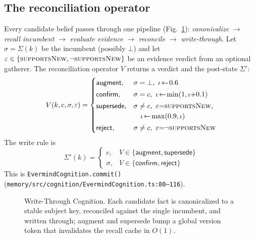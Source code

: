 \documentclass[journal,onecolumn,11pt]{IEEEtran}
\begin{document}
\subsection{The reconciliation operator}
Every candidate belief passes through one pipeline
(Fig.~\ref{fig:writethrough}): \emph{canonicalize} $\to$ \emph{recall incumbent}
$\to$ \emph{evaluate evidence} $\to$ \emph{reconcile} $\to$ \emph{write-through}.
Let $\sigma=\Sigma(k)$ be the incumbent (possibly $\bot$) and let
$\varepsilon\in\{\textsc{supportsNew},\neg\textsc{supportsNew}\}$ be an evidence
verdict from an optional gatherer. The reconciliation operator
$V$ returns a verdict and the post-state $\Sigma'$:
\begin{equation}
V(k,c,\sigma,\varepsilon)=
\begin{cases}
\textsf{augment}, & \sigma=\bot,\ \iota\!\leftarrow\!0.6\\[2pt]
\textsf{confirm}, & \sigma=c,\ \iota\!\leftarrow\!\min(1,\iota{+}0.1)\\[2pt]
\textsf{supersede}, & \sigma\neq c,\ \varepsilon{=}\textsc{supportsNew},\\
 & \quad \iota\!\leftarrow\!\max(0.9,\iota)\\[2pt]
\textsf{reject}, & \sigma\neq c,\ \varepsilon{=}\neg\textsc{supportsNew}
\end{cases}
\label{eq:verdict}
\end{equation}
The write rule is
\begin{equation}
\Sigma'(k)=
\begin{cases}
c, & V\in\{\textsf{augment},\textsf{supersede}\}\\
\sigma, & V\in\{\textsf{confirm},\textsf{reject}\}
\end{cases}
\label{eq:writerule}
\end{equation}
This is \texttt{EvermindCognition.commit()}
(\texttt{memory/src/cognition/EvermindCognition.ts:80--116}).

\begin{figure}[t]
\centering

\caption{Write-Through Cognition. Each candidate fact is canonicalized to a
stable subject key, reconciled against the single incumbent, and written through;
\textsf{augment} and \textsf{supersede} bump a global version token that
invalidates the recall cache in $O(1)$.}
\label{fig:writethrough}
\end{figure}
\end{document}

